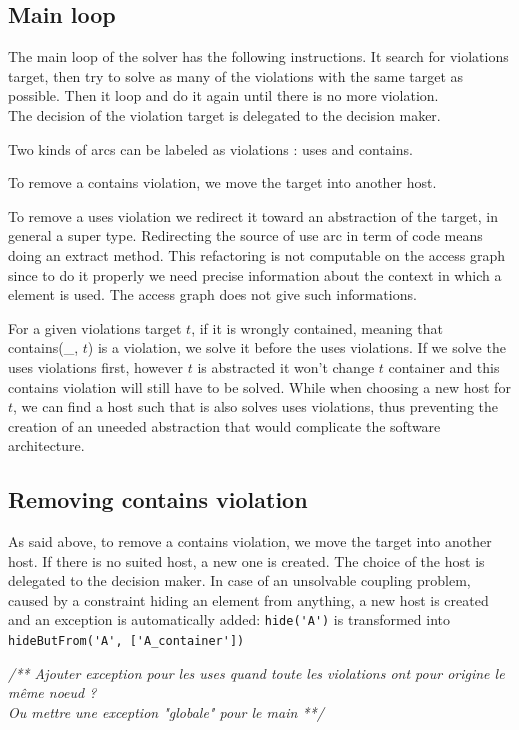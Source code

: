 \documentclass[]{article}
\newcommand{\cmt}[1]{ {\color{light-gray}\it/** #1 **/} }
\begin{document}
\subsection{Main loop}
The main loop of the solver has the following instructions. It search for violations target, then try to solve as many of the violations with the same target as possible. Then it loop and do it again until there is no more violation.\\

The decision of the violation target is delegated to the decision maker.

Two kinds of arcs can be labeled as violations : uses and contains.

To remove a contains violation, we move the target into another host.

To remove a uses violation we redirect it toward an abstraction of the target, in general a super type. Redirecting the source of use arc in term of code means doing an extract method. This refactoring is not computable on the access graph since to do it properly we need precise information about the context in which a element is used. The access graph does not give such informations.

For a given violations target $t$, if it is wrongly contained, meaning that contains(\_, $t$) is a violation, we solve it before the uses violations.
If we solve the uses violations first, however $t$ is abstracted it won't change $t$ container and this contains violation will still have to be solved.
While when choosing a new host for $t$, we can find a host such that is also solves uses violations, thus preventing the creation of an uneeded abstraction that would complicate the software architecture.

\subsection{Removing contains violation}
As said above, to remove a contains violation, we move the target into another host. If there is no suited host, a new one is created.
The choice of the host is delegated to the decision maker.
In case of an unsolvable coupling problem, caused by a constraint hiding an element from anything, a new host is created and an exception is automatically added:
\verb|hide('A')| is transformed into \verb|hideButFrom('A', ['A_container'])|

\cmt{Ajouter exception pour les uses quand toute les violations ont pour origine le même noeud ?\\
Ou mettre une exception "globale" pour le main}
\end{document}
